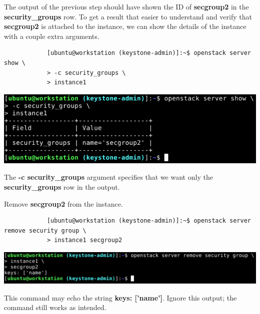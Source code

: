 \documentclass[letterpaper, 12pt]{article}
\begin{document}
\begin{enumerate}
    \begin{labstep}
        The output of the previous step should have shown the ID of \textbf{secgroup2} in the \textbf{security\_groups} row.
        To get a result that easier to understand and verify that \textbf{secgroup2} is attached to the instance, we can show the details of the instance with a couple extra arguments.
        \begin{lstlisting}
            [ubuntu@workstation (keystone-admin)]:~$ openstack server show \
            > -c security_groups \
            > instance1
        \end{lstlisting}

        \begin{center}
            \includegraphics[width=\linewidth]{images/part6/step3.png}
        \end{center}
    \end{labstep}

    \begin{tipbox}
        The \textbf{-c security\_groups} argument specifies that we want only the \textbf{security\_groups} row in the output.
    \end{tipbox}

    \begin{labstep}
        Remove \textbf{secgroup2} from the instance.
        \begin{lstlisting}
            [ubuntu@workstation (keystone-admin)]:~$ openstack server remove security group \
            > instance1 secgroup2
        \end{lstlisting}

        \begin{center}
            \includegraphics[width=\linewidth]{images/part6/step4.png}
        \end{center}
    \end{labstep}

    \begin{notebox}
        This command may echo the string \textbf{keys: ['name']}.
        Ignore this output; the command still works as intended.
    \end{notebox}


\end{enumerate}
\end{document}
